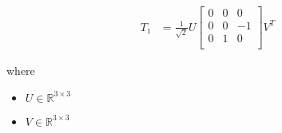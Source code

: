 \documentclass[12pt]{article}
\begin{document}
\begin{align*}
\textit{T₁} & = \frac{1}{ \sqrt{2}}\textit{U}\begin{bmatrix}
0 & 0 & 0\\
0 & 0 & -1\\
0 & 1 & 0\\
\end{bmatrix}\textit{V}^T
\end{align*}

where
\begin{itemize}
\item $\textit{U} \in \mathbb{R}^{ 3 \times 3 }$
\item $\textit{V} \in \mathbb{R}^{ 3 \times 3 }$
\end{itemize}
\end{document}
